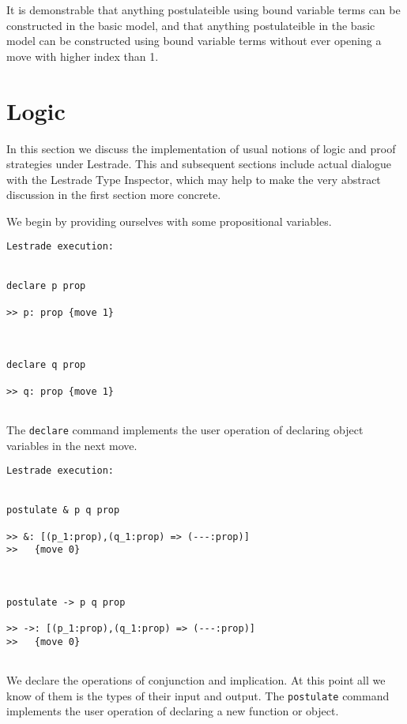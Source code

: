 \documentclass{article}
\begin{document}
It is demonstrable that anything postulateible using bound variable terms can be constructed in the basic model, and that anything postulateible in the basic model can be constructed using bound variable terms without ever opening a move with higher index than 1.

\newpage

\section{Logic}

In this section we discuss the implementation of usual notions of logic and proof strategies under Lestrade.  This and subsequent sections include
actual dialogue with the Lestrade Type Inspector, which may help to make the very abstract discussion in the first section more concrete.

We begin by providing ourselves with some propositional variables.

\begin{verbatim}Lestrade execution:


declare p prop

>> p: prop {move 1}



declare q prop

>> q: prop {move 1}


\end{verbatim}

The {\tt declare} command implements the user operation of declaring object variables in the next move.

\begin{verbatim}Lestrade execution:


postulate & p q prop

>> &: [(p_1:prop),(q_1:prop) => (---:prop)]
>>   {move 0}



postulate -> p q prop

>> ->: [(p_1:prop),(q_1:prop) => (---:prop)]
>>   {move 0}


\end{verbatim}

We declare the operations of conjunction and implication.  At this point all we know of them is the types of their input and output.  The {\tt postulate}
command implements the user operation of declaring a new function or object.
\end{document}
